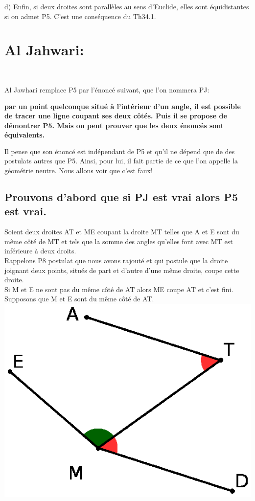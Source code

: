 \documentclass[a4paper, 12pt, twoside]{book}
\begin{document}
d) Enfin, si deux droites sont parallèles au sens d'Euclide, elles sont équidistantes si on admet P5. C'est une conséquence du Th34.1.\\  
 
  
\chapter{Al Jahwari:}\

Al Jawhari remplace P5 par l'énoncé suivant, que l'on nommera PJ:\

 \textbf{par un point quelconque situé à l'intérieur d'un angle, il est possible de tracer une ligne coupant ses deux côtés.  Puis il se propose de démontrer P5. Mais on peut prouver que les deux énoncés sont équivalents.} \
 
 Il pense que son énoncé est indépendant de P5 et qu'il ne dépend que de des postulats autres que P5. Ainsi, pour lui, il fait partie de ce que l'on appelle la géométrie neutre. Nous allons voir que c'est faux!\\
 
 

\section{Prouvons d'abord que si PJ est vrai alors P5 est vrai.}


Soient deux droites AT et ME coupant la droite MT telles que A et E sont du même côté de MT et tels que la somme des angles qu'elles font avec MT est inférieure à deux droits.\\

Rappelons P8 postulat que nous avons rajouté et qui postule que la droite joignant deux points, situés de part et d'autre d'une même droite, coupe cette droite.\\

Si M et E ne sont pas du même côté de AT alors ME coupe AT et c'est fini. \\

Supposons que M et E sont du même côté de AT. \\


\includegraphics[scale=0.7]{figures/ALJAHW5.eps} \\
\end{document}

